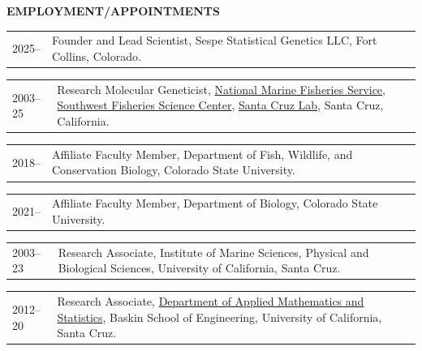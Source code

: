 \documentclass[11pt]{article}
\newlength{\myindent}
\newlength{\preskip}
\newlength{\scndcol}
\begin{document}
{\bf EMPLOYMENT/APPOINTMENTS}
\vspace*{\preskip}

\begin{tabular}{ @{}p{2.5\myindent} p{\scndcol}@{}  }
\hspace*{\myindent}2025-- & Founder and Lead Scientist, Sespe Statistical Genetics LLC, Fort Collins, Colorado.
\\
\end{tabular}


\begin{tabular}{ @{}p{2.5\myindent} p{\scndcol}@{}  }
\hspace*{\myindent}2003--25 & Research Molecular Geneticist, \href{http://www.nmfs.noaa.gov/}{National 
Marine Fisheries Service}, \href{http://swfsc.nmfs.noaa.gov/}{Southwest Fisheries Science Center}, \href{http://santacruz.nmfs.noaa.gov/}{Santa Cruz Lab}, Santa Cruz,  California. 
\\
\end{tabular}

\begin{tabular}{ @{}p{2.5\myindent} p{\scndcol}@{}  }
\hspace*{\myindent}2018-- & Affiliate Faculty Member, Department of Fish, Wildlife, and Conservation Biology, Colorado State University.
\\
\end{tabular}

\begin{tabular}{ @{}p{2.5\myindent} p{\scndcol}@{}  }
\hspace*{\myindent}2021-- & Affiliate Faculty Member, Department of Biology, Colorado State University.
\\
\end{tabular}



\begin{tabular}{ @{}p{2.5\myindent} p{\scndcol}@{}  }
\hspace*{\myindent}2003--23 & Research Associate, Institute of Marine Sciences, Physical and Biological Sciences, University of California, Santa Cruz.
\\
\end{tabular}

\begin{tabular}{ @{}p{2.5\myindent} p{\scndcol}@{}  }
\hspace*{\myindent}2012--20 & Research Associate, \href{http://www.ams.ucsc.edu/}{Department of Applied Mathematics and Statistics}, Baskin School of Engineering, University of California, Santa Cruz.
\\
\end{tabular}
\end{document}
